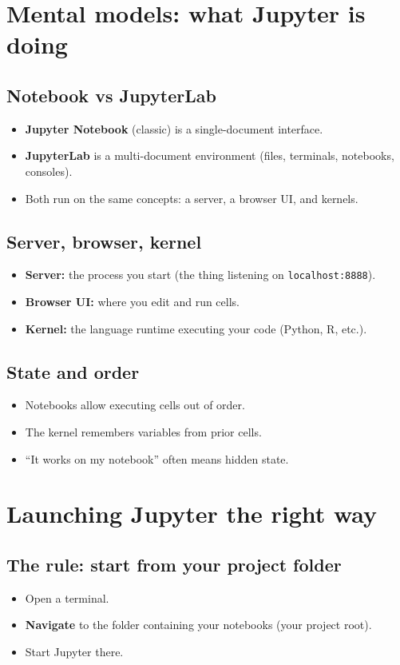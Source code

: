 \section{Mental models: what Jupyter is doing}
\subsection{Notebook vs JupyterLab}
\begin{itemize}
\item \textbf{Jupyter Notebook} (classic) is a single-document interface.
\item \textbf{JupyterLab} is a multi-document environment (files, terminals, notebooks, consoles).
\item Both run on the same concepts: a server, a browser UI, and kernels.
\end{itemize}

\subsection{Server, browser, kernel}
\begin{itemize}
\item \textbf{Server:} the process you start (the thing listening on \texttt{localhost:8888}).
\item \textbf{Browser UI:} where you edit and run cells.
\item \textbf{Kernel:} the language runtime executing your code (Python, R, etc.).
\end{itemize}

\subsection{State and order}
\begin{itemize}
\item Notebooks allow executing cells out of order.
\item The kernel remembers variables from prior cells.
\item ``It works on my notebook'' often means hidden state.
\end{itemize}

\section{Launching Jupyter the right way}
\subsection{The rule: start from your project folder}
\begin{itemize}
\item Open a terminal.
\item \textbf{Navigate} to the folder containing your notebooks (your project root).
\item Start Jupyter there.
\end{itemize}

